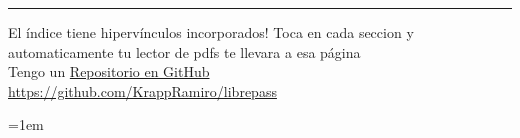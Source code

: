\documentclass{article}
\begin{document}



\tableofcontents		\noindent\rule{\textwidth}{0.7pt }
El índice tiene hipervínculos incorporados!
Toca en cada seccion y automaticamente tu lector de pdfs te llevara a esa página
\\[12pt] %
{\large Tengo un
\href{https://github.com/KrappRamiro/librepass}{Repositorio en GitHub}}\\
{\small \url{https://github.com/KrappRamiro/librepass}}








{
	\emergencystretch=1em %
	\printbibliography
}
\end{document}
